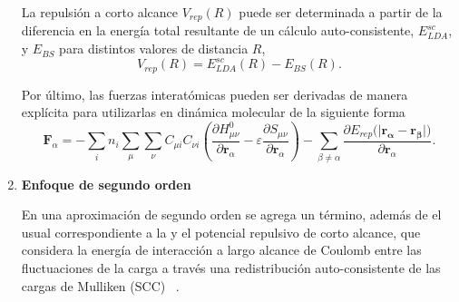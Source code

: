 \begin{enumerate}
        La repulsión a corto alcance $V_{rep}(R)$ puede ser determinada a partir
        de la diferencia en la energía total resultante de un cálculo 
        auto-consistente, $E_{LDA}^{sc}$, y $E_{BS}$ para distintos valores de 
        distancia $R$,
        \begin{equation*}
        V_{rep}(R) = E_{LDA}^{sc}(R) - E_{BS}(R).
        \end{equation*}

        Por último, las fuerzas interatómicas pueden ser derivadas de manera
        explícita para utilizarlas en dinámica molecular de la siguiente forma
        \begin{equation*}
        \mathbf{F}_{\alpha} = - \sum_i n_i \sum_{\mu} \sum_{\nu} C_{\mu i} C_{\nu i} \left(\frac{\partial H_{\mu \nu}^0}{\partial \mathbf{r}_{\alpha}} - \varepsilon \frac{\partial S_{\mu \nu}}{\partial \mathbf{r}_{\alpha}}\right) - \sum_{\beta \neq \alpha} \frac{\partial E_{rep}(|\mathbf{r_{\alpha} - \mathbf{r}_{\beta}|)}}{\partial \mathbf{r}_{\alpha}}.
        \end{equation*}

    \item \textbf{Enfoque de segundo orden}

        En una aproximación de segundo orden se agrega un término, además de
        el usual correspondiente a la  y el 
        potencial repulsivo de corto alcance, que considera la energía de
        interacción a largo alcance de Coulomb entre las fluctuaciones de la 
        carga a través una redistribución auto-consistente de las cargas de 
        Mulliken (SCC) ~\cite{dftb3}.


\end{enumerate}

